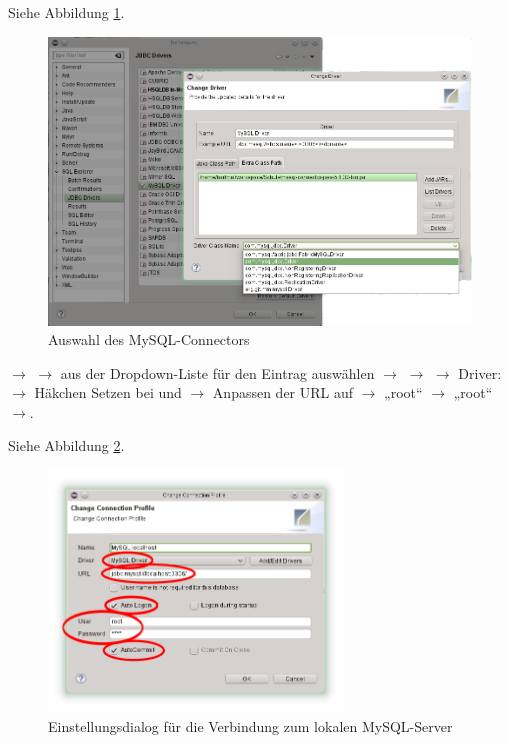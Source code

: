 Siehe Abbildung \ref{fig:mysql-connector}.

\begin{figure}[h]
  \centering
   \includegraphics[width=1.0\textwidth]{./inf/SEKII/01_Vorbereitung/MySQL-Driver.png}
   \caption{Auswahl des MySQL-Connectors}
   \label{fig:mysql-connector}
\end{figure}

$\rightarrow$  $\rightarrow$ aus der
Dropdown-Liste für  den Eintrag
 auswählen $\rightarrow$ 
$\rightarrow$  $\rightarrow$ Driver: 
$\rightarrow$ Häkchen Setzen bei  und 
$\rightarrow$ Anpassen der URL auf 
$\rightarrow$  „root“ $\rightarrow$  „root“
$\rightarrow$.

Siehe Abbildung \ref{fig:sql-explorer-connection-profile}.

\begin{figure}[h]
  \centering
   \includegraphics[width=0.7\textwidth]{./inf/SEKII/01_Vorbereitung/SQL-Explorer_Connection-Profile.png}
   \caption{Einstellungsdialog für die Verbindung zum lokalen MySQL-Server}
   \label{fig:sql-explorer-connection-profile}
\end{figure}

